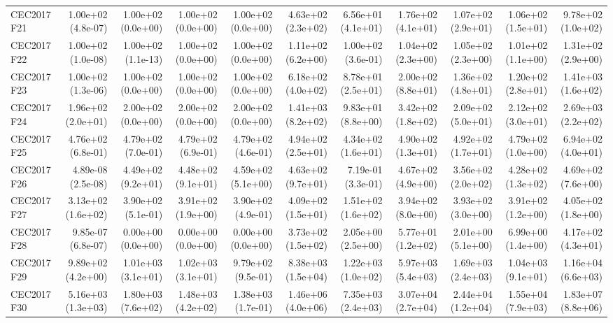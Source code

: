 \begin{longtable}{lrrrrrrrrrr}
CEC2017 F21 & 1.00e+02 (4.8e-07) & 1.00e+02 (0.0e+00) & 1.00e+02 (0.0e+00) & 1.00e+02 (0.0e+00) & 4.63e+02 (2.3e+02) & 6.56e+01 (4.1e+01) & 1.76e+02 (4.1e+01) & 1.07e+02 (2.9e+01) & 1.06e+02 (1.5e+01) & 9.78e+02 (1.0e+02) \\
CEC2017 F22 & 1.00e+02 (1.0e-08) & 1.00e+02 (1.1e-13) & 1.00e+02 (0.0e+00) & 1.00e+02 (0.0e+00) & 1.11e+02 (6.2e+00) & 1.00e+02 (3.6e-01) & 1.04e+02 (2.3e+00) & 1.05e+02 (2.3e+00) & 1.01e+02 (1.1e+00) & 1.31e+02 (2.9e+00) \\
CEC2017 F23 & 1.00e+02 (1.3e-06) & 1.00e+02 (0.0e+00) & 1.00e+02 (0.0e+00) & 1.00e+02 (0.0e+00) & 6.18e+02 (4.0e+02) & 8.78e+01 (2.5e+01) & 2.00e+02 (8.8e+01) & 1.36e+02 (4.8e+01) & 1.20e+02 (2.8e+01) & 1.41e+03 (1.6e+02) \\
CEC2017 F24 & 1.96e+02 (2.0e+01) & 2.00e+02 (0.0e+00) & 2.00e+02 (0.0e+00) & 2.00e+02 (0.0e+00) & 1.41e+03 (8.2e+02) & 9.83e+01 (8.8e+00) & 3.42e+02 (1.8e+02) & 2.09e+02 (5.0e+01) & 2.12e+02 (3.0e+01) & 2.69e+03 (2.2e+02) \\
CEC2017 F25 & 4.76e+02 (6.8e-01) & 4.79e+02 (7.0e-01) & 4.79e+02 (6.9e-01) & 4.79e+02 (4.6e-01) & 4.94e+02 (2.5e+01) & 4.34e+02 (1.6e+01) & 4.90e+02 (1.3e+01) & 4.92e+02 (1.7e+01) & 4.79e+02 (1.0e+00) & 6.94e+02 (4.0e+01) \\
CEC2017 F26 & 4.89e-08 (2.5e-08) & 4.49e+02 (9.2e+01) & 4.48e+02 (9.1e+01) & 4.59e+02 (5.1e+00) & 4.63e+02 (9.7e+01) & 7.19e-01 (3.3e-01) & 4.67e+02 (4.9e+00) & 3.56e+02 (2.0e+02) & 4.28e+02 (1.3e+02) & 4.69e+02 (7.6e+00) \\
CEC2017 F27 & 3.13e+02 (1.6e+02) & 3.90e+02 (5.1e-01) & 3.91e+02 (1.9e+00) & 3.90e+02 (4.9e-01) & 4.09e+02 (1.5e+01) & 1.51e+02 (1.6e+02) & 3.94e+02 (8.0e+00) & 3.93e+02 (3.0e+00) & 3.91e+02 (1.2e+00) & 4.05e+02 (1.8e+00) \\
CEC2017 F28 & 9.85e-07 (6.8e-07) & 0.00e+00 (0.0e+00) & 0.00e+00 (0.0e+00) & 0.00e+00 (0.0e+00) & 3.73e+02 (1.5e+02) & 2.05e+00 (2.5e+00) & 5.77e+01 (1.2e+02) & 2.01e+00 (5.1e+00) & 6.99e+00 (1.4e+00) & 4.17e+02 (4.3e+01) \\
CEC2017 F29 & 9.89e+02 (4.2e+00) & 1.01e+03 (3.1e+01) & 1.02e+03 (3.1e+01) & 9.79e+02 (9.5e-01) & 8.38e+03 (1.5e+04) & 1.22e+03 (1.0e+02) & 5.97e+03 (5.4e+03) & 1.69e+03 (2.4e+03) & 1.04e+03 (9.1e+01) & 1.16e+04 (6.6e+03) \\
CEC2017 F30 & 5.16e+03 (1.3e+03) & 1.80e+03 (7.6e+02) & 1.48e+03 (4.2e+02) & 1.38e+03 (1.7e-01) & 1.46e+06 (4.0e+06) & 7.35e+03 (2.4e+03) & 3.07e+04 (2.7e+04) & 2.44e+04 (1.2e+04) & 1.55e+04 (7.9e+03) & 1.83e+07 (8.8e+06) \\

\end{longtable}
